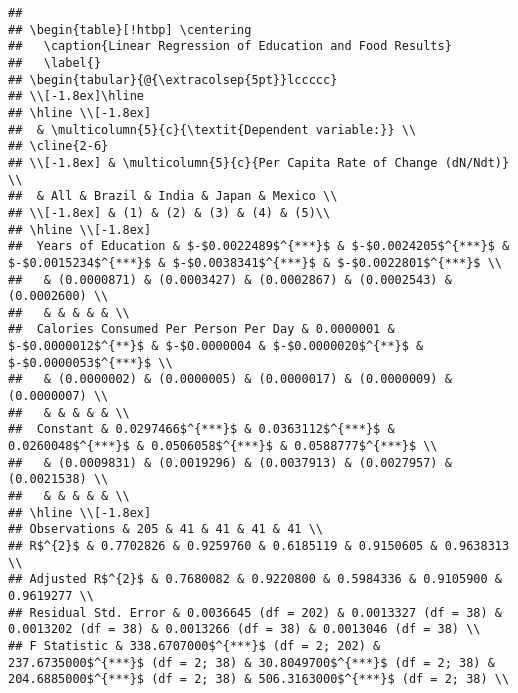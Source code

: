 \documentclass[]{article}
\begin{document}
\begin{verbatim}
## 
## \begin{table}[!htbp] \centering 
##   \caption{Linear Regression of Education and Food Results} 
##   \label{} 
## \begin{tabular}{@{\extracolsep{5pt}}lccccc} 
## \\[-1.8ex]\hline 
## \hline \\[-1.8ex] 
##  & \multicolumn{5}{c}{\textit{Dependent variable:}} \\ 
## \cline{2-6} 
## \\[-1.8ex] & \multicolumn{5}{c}{Per Capita Rate of Change (dN/Ndt)} \\ 
##  & All & Brazil & India & Japan & Mexico \\ 
## \\[-1.8ex] & (1) & (2) & (3) & (4) & (5)\\ 
## \hline \\[-1.8ex] 
##  Years of Education & $-$0.0022489$^{***}$ & $-$0.0024205$^{***}$ & $-$0.0015234$^{***}$ & $-$0.0038341$^{***}$ & $-$0.0022801$^{***}$ \\ 
##   & (0.0000871) & (0.0003427) & (0.0002867) & (0.0002543) & (0.0002600) \\ 
##   & & & & & \\ 
##  Calories Consumed Per Person Per Day & 0.0000001 & $-$0.0000012$^{**}$ & $-$0.0000004 & $-$0.0000020$^{**}$ & $-$0.0000053$^{***}$ \\ 
##   & (0.0000002) & (0.0000005) & (0.0000017) & (0.0000009) & (0.0000007) \\ 
##   & & & & & \\ 
##  Constant & 0.0297466$^{***}$ & 0.0363112$^{***}$ & 0.0260048$^{***}$ & 0.0506058$^{***}$ & 0.0588777$^{***}$ \\ 
##   & (0.0009831) & (0.0019296) & (0.0037913) & (0.0027957) & (0.0021538) \\ 
##   & & & & & \\ 
## \hline \\[-1.8ex] 
## Observations & 205 & 41 & 41 & 41 & 41 \\ 
## R$^{2}$ & 0.7702826 & 0.9259760 & 0.6185119 & 0.9150605 & 0.9638313 \\ 
## Adjusted R$^{2}$ & 0.7680082 & 0.9220800 & 0.5984336 & 0.9105900 & 0.9619277 \\ 
## Residual Std. Error & 0.0036645 (df = 202) & 0.0013327 (df = 38) & 0.0013202 (df = 38) & 0.0013266 (df = 38) & 0.0013046 (df = 38) \\ 
## F Statistic & 338.6707000$^{***}$ (df = 2; 202) & 237.6735000$^{***}$ (df = 2; 38) & 30.8049700$^{***}$ (df = 2; 38) & 204.6885000$^{***}$ (df = 2; 38) & 506.3163000$^{***}$ (df = 2; 38) \\ 

\end{verbatim}
\end{document}
